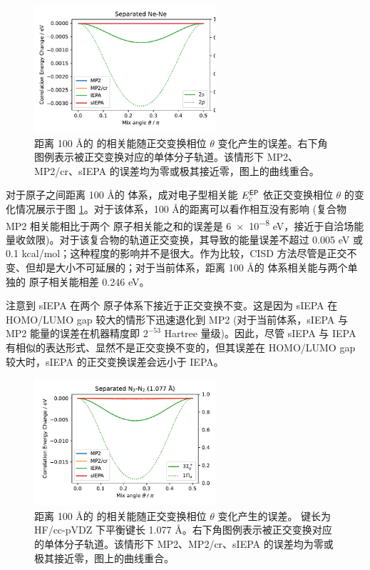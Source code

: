 \begin{figure}[!ht]
  \centering
  \includegraphics[width=0.6\textwidth]{assets/invar-sep-Ne.pdf}
  \caption{距离 100 \AA 的  的相关能随正交变换相位 $\theta$ 变化产生的误差。右下角图例表示被正交变换对应的单体分子轨道。该情形下 MP2、MP2/cr、sIEPA 的误差均为零或极其接近零，图上的曲线重合。}
  \label{fig.2.invar-sep-Ne}
\end{figure}

对于原子之间距离 100 \AA 的  体系，成对电子型相关能 $E_\mathrm{c}^{\textsf{EP}}$ 依正交变换相位 $\theta$ 的变化情况展示于图 \ref{fig.2.invar-sep-Ne}。对于该体系，100 \AA 的距离可以看作相互没有影响 (复合物 MP2 相关能相比于两个  原子相关能之和的误差是 \num{6e-8} eV，接近于自洽场能量收敛限)。对于该复合物的轨道正交变换，其导致的能量误差不超过 0.005 eV 或 0.1 kcal/mol；这种程度的影响并不是很大。作为比较，CISD 方法尽管是正交不变、但却是大小不可延展的；对于当前体系，距离 100 \AA 的  体系相关能与两个单独的  原子相关能相差 0.246 eV。

注意到 sIEPA 在两个  原子体系下接近于正交变换不变。这是因为 sIEPA 在 HOMO/LUMO gap 较大的情形下迅速退化到 MP2 (对于当前体系，sIEPA 与 MP2 能量的误差在机器精度即 $2^{-53}$ Hartree 量级)。因此，尽管 sIEPA 与 IEPA 有相似的表达形式、显然不是正交变换不变的，但其误差在 HOMO/LUMO gap 较大时，sIEPA 的正交变换误差会远小于 IEPA。

\begin{figure}[!ht]
  \centering
  \includegraphics[width=0.6\textwidth]{assets/invar-sep-N2-1.pdf}
  \caption{距离 100 \AA 的  的相关能随正交变换相位 $\theta$ 变化产生的误差。 键长为 HF/cc-pVDZ 下平衡键长 1.077 \AA。右下角图例表示被正交变换对应的单体分子轨道。该情形下 MP2、MP2/cr、sIEPA 的误差均为零或极其接近零，图上的曲线重合。}
  \label{fig.2.invar-sep-N2-1}
\end{figure}

